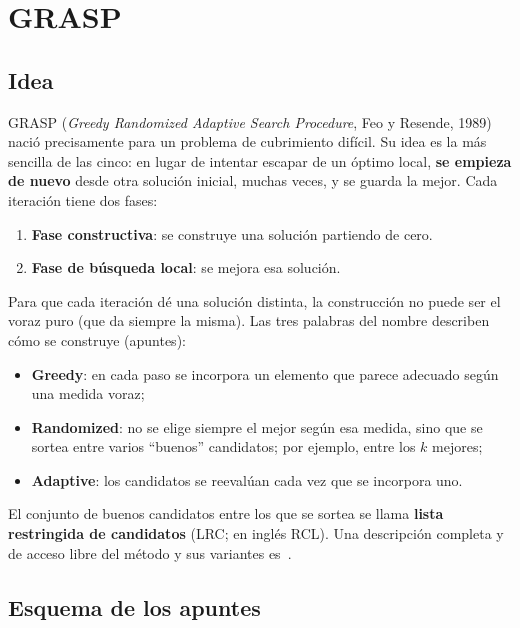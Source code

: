 \section{GRASP}\label{sec:grasp}

\subsection{Idea}

GRASP (\emph{Greedy Randomized Adaptive Search Procedure}, Feo y Resende, 1989) nació
precisamente para un problema de cubrimiento difícil. Su idea es la más sencilla de las
cinco: en lugar de intentar escapar de un óptimo local, \textbf{se empieza de nuevo} desde
otra solución inicial, muchas veces, y se guarda la mejor. Cada iteración tiene dos fases:
\begin{enumerate}
  \item \textbf{Fase constructiva}: se construye una solución partiendo de cero.
  \item \textbf{Fase de búsqueda local}: se mejora esa solución.
\end{enumerate}
Para que cada iteración dé una solución distinta, la construcción no puede ser el voraz
puro (que da siempre la misma). Las tres palabras del nombre describen cómo se construye
(apuntes):
\begin{itemize}
  \item \textbf{Greedy}: en cada paso se incorpora un elemento que parece adecuado según una
        medida voraz;
  \item \textbf{Randomized}: no se elige siempre el mejor según esa medida, sino que se sortea
        entre varios ``buenos'' candidatos; por ejemplo, entre los $k$ mejores;
  \item \textbf{Adaptive}: los candidatos se reevalúan cada vez que se incorpora uno.
\end{itemize}
El conjunto de buenos candidatos entre los que se sortea se llama \textbf{lista restringida
de candidatos} (LRC; en inglés RCL). Una descripción completa y de acceso libre del método y
sus variantes es~\cite{resende}.

\subsection{Esquema de los apuntes}


